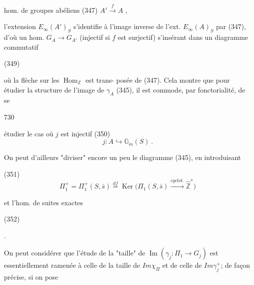 \newpage


hom. de groupes abéliens
(347) $A' \xrightarrow{f} A$ ,

l'extension $E_{\infty}(A')_S$ s'identifie
à l'image inverse de l'ext. $E_{\infty}(A)_S$
par (347), d'où un hom.
$G_A \to G_{A'}$ (injectif si $f$ est surjectif)
s'insérant dans un diagramme
commutatif

(349)

où la flèche sur les $\operatorname{Hom}_{\mathbb{Z}}$ est trans-
posée de (347). Cela montre que
pour étudier la structure de l'image de $\gamma_A$ (345),
il est commode, par fonctorialité, de se

\newpage


730

étudier le cas où $j$ est injectif
(350) $$j : A \hookrightarrow \mathbb{G}_m(S) \ .$$

On peut d'ailleurs "diviser" encore un peu le diagramme (345), en introduisant

(351) $$\Pi_1^+ = \Pi_1^+(S, \bar{s}) \overset{df}{=} \operatorname{Ker}\Big(\Pi_1(S, \bar{s}) \overset{cyclot.}{\longrightarrow} \hat{\mathbb{Z}}^*\Big)$$

et l'hom. de suites exactes

(352)
.

On peut considérer que l'étude de la "taille" de $\operatorname{Im}(\gamma_j : \Pi_1 \to G_j)$ est essentiellement ramenée à celle de la taille de $Im \chi_{\Pi}$ et de celle de $Im \gamma_j^+$; de façon précise, si on pose

